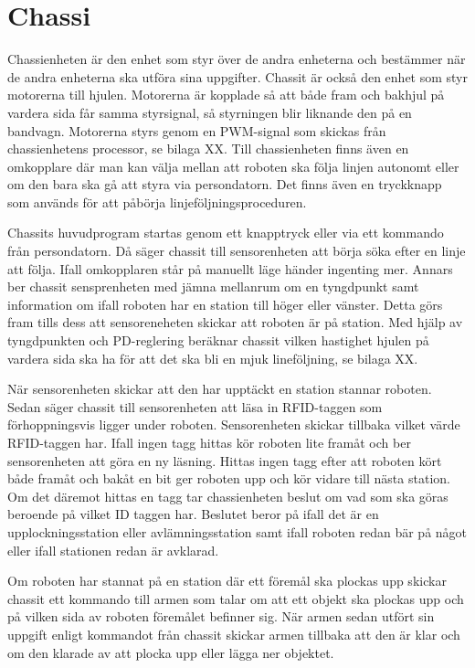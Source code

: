 
\section{Chassi}

Chassienheten är den enhet som styr över de andra enheterna och bestämmer när de andra enheterna ska utföra sina uppgifter. Chassit är också den enhet som styr motorerna till hjulen. Motorerna är kopplade så att både fram och bakhjul på vardera sida får samma styrsignal, så styrningen blir liknande den på en bandvagn. Motorerna styrs genom en PWM-signal som skickas från chassienhetens processor, se bilaga XX. Till chassienheten finns även en omkopplare där man kan välja mellan att roboten ska följa linjen autonomt eller om den bara ska gå att styra via persondatorn. Det finns även en tryckknapp som används för att påbörja linjeföljningsproceduren.


Chassits huvudprogram startas genom ett knapptryck eller via ett kommando från persondatorn. Då säger chassit till sensorenheten att börja söka efter en linje att följa. Ifall omkopplaren står på manuellt läge händer ingenting mer. Annars ber chassit sensprenheten med jämna mellanrum om en tyngdpunkt samt information om ifall roboten har en station till höger eller vänster. Detta görs fram tills dess att sensoreneheten skickar att roboten är på station. Med hjälp av tyngdpunkten och PD-reglering beräknar chassit vilken hastighet hjulen på vardera sida ska ha för att det ska bli en mjuk lineföljning, se bilaga XX. 

När sensorenheten skickar att den har upptäckt en station stannar roboten. Sedan säger chassit till sensorenheten att läsa in RFID-taggen som förhoppningsvis ligger under roboten. Sensorenheten skickar tillbaka vilket värde RFID-taggen har. Ifall ingen tagg hittas kör roboten lite framåt och ber sensorenheten att göra en ny läsning. Hittas ingen tagg efter att roboten kört både framåt och bakåt en bit ger roboten upp och kör vidare till nästa station. Om det däremot hittas en tagg tar chassienheten beslut om vad som ska göras beroende på vilket ID taggen har. Beslutet beror på ifall det är en upplockningsstation eller avlämningsstation samt ifall roboten redan bär på något eller ifall stationen redan är avklarad. 

Om roboten har stannat på en station där ett föremål ska plockas upp skickar chassit ett kommando till armen som talar om att ett objekt ska plockas upp och på vilken sida av roboten föremålet befinner sig. När armen sedan utfört sin uppgift enligt kommandot från chassit skickar armen tillbaka att den är klar och om den klarade av att plocka upp eller lägga ner objektet. 


